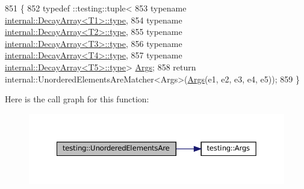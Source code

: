 \begin{DoxyCode}
851                   \{
852   typedef ::testing::tuple<
853       \textcolor{keyword}{typename} \hyperlink{namespacegenerate__debs_a50bc9a7ecac9584553e089a448bcde58}{internal::DecayArray<T1>::type},
854       \textcolor{keyword}{typename} \hyperlink{namespacegenerate__debs_a50bc9a7ecac9584553e089a448bcde58}{internal::DecayArray<T2>::type},
855       \textcolor{keyword}{typename} \hyperlink{namespacegenerate__debs_a50bc9a7ecac9584553e089a448bcde58}{internal::DecayArray<T3>::type},
856       \textcolor{keyword}{typename} \hyperlink{namespacegenerate__debs_a50bc9a7ecac9584553e089a448bcde58}{internal::DecayArray<T4>::type},
857       \textcolor{keyword}{typename} \hyperlink{namespacegenerate__debs_a50bc9a7ecac9584553e089a448bcde58}{internal::DecayArray<T5>::type}> 
      \hyperlink{namespacetesting_a09ac462e8d6ed468cbfaa9c767aee0aa}{Args};
858   \textcolor{keywordflow}{return} internal::UnorderedElementsAreMatcher<Args>(\hyperlink{namespacetesting_a09ac462e8d6ed468cbfaa9c767aee0aa}{Args}(e1, e2, e3, e4, e5));
859 \}
\end{DoxyCode}
Here is the call graph for this function\+:
\nopagebreak
\begin{figure}[H]
\begin{center}
\leavevmode
\includegraphics[width=350pt]{namespacetesting_a5e0ff76eb3f61b6c79b60311ceca73d3_cgraph}
\end{center}
\end{figure}
\mbox{\label{namespacetesting_aff1859501ecd94dd1bc428d146a66fdc}} 
